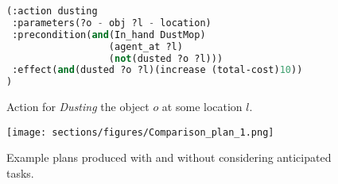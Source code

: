 
\begin{figure}[tbp] %
\captionsetup{font=scriptsize}
\begin{center}
    \begin{minipage}{0.45\textwidth} %
        \small{
        \begin{lstlisting}[language=Lisp, frame=single, breaklines=true]
(:action dusting
 :parameters(?o - obj ?l - location)
 :precondition(and(In_hand DustMop)  
                  (agent_at ?l)
                  (not(dusted ?o ?l)))
 :effect(and(dusted ?o ?l)(increase (total-cost)10))
)
        \end{lstlisting}
        }
    \end{minipage}
    \setlength{\abovecaptionskip}{0pt}
    \setlength{\belowcaptionskip}{-15pt}
    \caption{Action for \textit{Dusting} the object $o$ at some location $l$.}
    \label{fig:Action}
    \vspace{0.5em}
\end{center}
\end{figure}
\begin{figure}[tb]
\centering
\captionsetup{font=scriptsize}
\vspace{0.3em}
\texttt{[image: sections/figures/Comparison\_plan\_1.png]}
\caption{Example plans produced with and without considering anticipated tasks.}
\label{fig:comparison_plan}
\vspace{-1em}
\end{figure}
